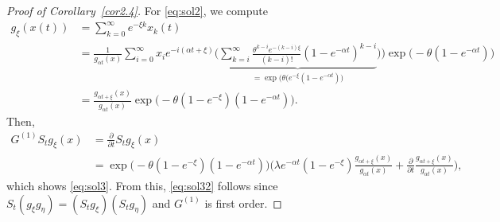 \documentclass[10pt,a4paper]{amsart}
\begin{document}
\begin{proof}[Proof of Corollary~\ref{cor2.4}]
  For \eqref{eq:sol2}, we compute
  \begin{align*}
    g_{ \xi}(x(t)) & = \sum_{k=0}^\infty e^{- \xi k} x_k(t) \\ & = \frac{1}{g_{\alpha t}(x)} \! \sum_{i=0}^\infty x_i e^{-i(\alpha t+\xi)} \Big(\underbrace{ \sum_{k=i}^\infty  \frac{\theta^{k-i} e^{- (k-i)\xi}}{(k-i)!}
      (1-e^{-\alpha t})^{k-i}}_{= \exp\big( \theta(e^{- \xi} ( 1\! - e^{-\alpha t}) \big) }\Big)\Big)\exp\Big(\!-\theta(1 \! -e^{-\alpha t})\Big)\\ & =
    \frac{g_{\alpha t + \xi}(x)}{ g_{\alpha t}(x)}
    \exp\Big(-\theta(1-e^{- \xi})(1-e^{-\alpha t})\Big).
  \end{align*}
  Then,
  \begin{align*}
    G^{(1)}S_t g_{\xi}(x) & = \frac{\partial}{\partial t}S_t g_{\xi}(x) \\ & = \exp\Big(-\theta(1-e^{- \xi})(1-e^{-\alpha t})\Big)\Big(\lambda e^{-\alpha t}(1 - e^{- \xi})\frac{g_{\alpha  t + \xi}(x)}{g_{\alpha t}(x)} + \frac{\partial}{\partial t} \frac{g_{\alpha t + \xi}(x)}{g_{\alpha t}(x)}\Big),
\end{align*}
which shows \eqref{eq:sol3}. From this, \eqref{eq:sol32} follows since $S_t(g_{\xi} g_{\eta}) = (S_t g_{\xi})(S_tg_{\eta})$ and $G^{(1)}$ is first order. 


\end{proof}
\end{document}

